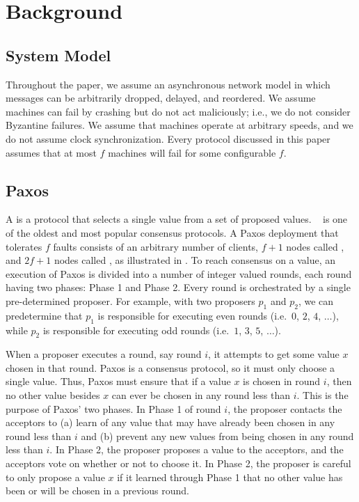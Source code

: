 \section{Background}

\subsection{System Model}
Throughout the paper, we assume an asynchronous network model in which messages
can be arbitrarily dropped, delayed, and reordered. We assume machines can fail
by crashing but do not act maliciously; i.e., we do not consider Byzantine
failures. We assume that machines operate at arbitrary speeds, and we do not
assume clock synchronization. Every protocol discussed in this paper assumes
that at most $f$ machines will fail for some configurable $f$.

\subsection{Paxos}
A  is a protocol that selects a single value from a
set of proposed values. ~\cite{lamport1998part,
lamport2001paxos} is one of the oldest and most popular consensus protocols. A
Paxos deployment that tolerates $f$ faults consists of an arbitrary number of
clients, $f+1$ nodes called , and $2f+1$ nodes called
, as illustrated in .
%
To reach consensus on a value, an execution of Paxos is divided into a number
of integer valued rounds, each round having two phases: Phase 1 and Phase 2.
Every round is orchestrated by a single pre-determined proposer. For example,
with two proposers $p_1$ and $p_2$, we can predetermine that $p_1$ is
responsible for executing even rounds (i.e.\ $0$, $2$, $4$, $\ldots$), while
$p_2$ is responsible for executing odd rounds (i.e.\ $1$, $3$, $5$, $\ldots$).

{}

When a proposer executes a round, say round $i$, it attempts to get some value
$x$ chosen in that round. Paxos is a consensus protocol, so it must only choose
a single value. Thus, Paxos must ensure that if a value $x$ is chosen in round
$i$, then no other value besides $x$ can ever be chosen in any round less than
$i$. This is the purpose of Paxos' two phases. In Phase 1 of round $i$, the
proposer contacts the acceptors to (a) learn of any value that may have already
been chosen in any round less than $i$ and (b) prevent any new values from
being chosen in any round less than $i$. In Phase 2, the proposer proposes a
value to the acceptors, and the acceptors vote on whether or not to choose it.
In Phase 2, the proposer is careful to only propose a value $x$ if it learned
through Phase 1 that no other value has been or will be chosen in a previous
round.

